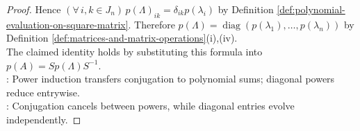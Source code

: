 \begin{theorem}
\begin{proof}
Hence $(\forall\,i,k\in J_n)\,p(\Lambda)_{ik}=\delta_{ik}p(\lambda_i)$ by Definition \ref{def:polynomial-evaluation-on-square-matrix}. Therefore $p(\Lambda)=\operatorname{diag}(p(\lambda_1),\ldots,p(\lambda_n))$ by Definition \ref{def:matrices-and-matrix-operations}(i),(iv).\\
The claimed identity holds by substituting this formula into $p(A)=Sp(\Lambda)S^{-1}$.\\
: Power induction transfers conjugation to polynomial sums; diagonal powers reduce entrywise.\\
: Conjugation cancels between powers, while diagonal entries evolve independently.
\end{proof}
\end{theorem}
